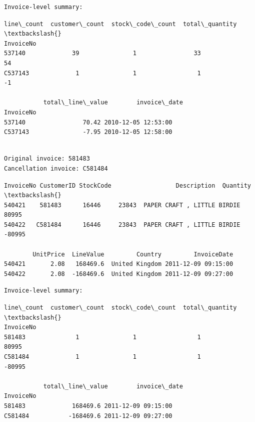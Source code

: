 \documentclass[11pt]{article}
\begin{document}
    
    \begin{Verbatim}[commandchars=\\\{\}]
Invoice-level summary:
    \end{Verbatim}

    
    \begin{Verbatim}[commandchars=\\\{\}]
           line\_count  customer\_count  stock\_code\_count  total\_quantity  \textbackslash{}
InvoiceNo                                                                 
537140             39               1                33              54   
C537143             1               1                 1              -1   

           total\_line\_value        invoice\_date  
InvoiceNo                                        
537140                70.42 2010-12-05 12:53:00  
C537143               -7.95 2010-12-05 12:58:00  
    \end{Verbatim}

    
    \begin{Verbatim}[commandchars=\\\{\}]

Original invoice: 581483
Cancellation invoice: C581484
    \end{Verbatim}

    
    \begin{Verbatim}[commandchars=\\\{\}]
       InvoiceNo CustomerID StockCode                  Description  Quantity  \textbackslash{}
540421    581483      16446     23843  PAPER CRAFT , LITTLE BIRDIE     80995   
540422   C581484      16446     23843  PAPER CRAFT , LITTLE BIRDIE    -80995   

        UnitPrice  LineValue         Country         InvoiceDate  
540421       2.08   168469.6  United Kingdom 2011-12-09 09:15:00  
540422       2.08  -168469.6  United Kingdom 2011-12-09 09:27:00  
    \end{Verbatim}

    
    \begin{Verbatim}[commandchars=\\\{\}]
Invoice-level summary:
    \end{Verbatim}

    
    \begin{Verbatim}[commandchars=\\\{\}]
           line\_count  customer\_count  stock\_code\_count  total\_quantity  \textbackslash{}
InvoiceNo                                                                 
581483              1               1                 1           80995   
C581484             1               1                 1          -80995   

           total\_line\_value        invoice\_date  
InvoiceNo                                        
581483             168469.6 2011-12-09 09:15:00  
C581484           -168469.6 2011-12-09 09:27:00  
    \end{Verbatim}
\end{document}
